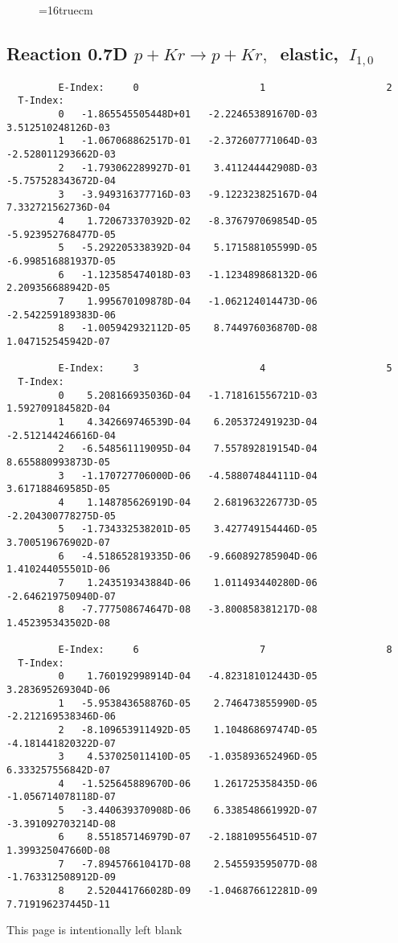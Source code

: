 \documentclass[12pt,dvipdfmx]{article}
\begin{document}
\begin{figure} \label{0.7T}
\epsfxsize=16truecm
\end{figure}
\newpage

\subsection{
Reaction 0.7D  $p + Kr \rightarrow p + Kr ,\ $
 elastic, $\  I_{1,0}$
}

\begin{small}\begin{verbatim}
         E-Index:     0                     1                     2
  T-Index:
         0   -1.865545505448D+01   -2.224653891670D-03    3.512510248126D-03
         1   -1.067068862517D-01   -2.372607771064D-03   -2.528011293662D-03
         2   -1.793062289927D-01    3.411244442908D-03   -5.757528343672D-04
         3   -3.949316377716D-03   -9.122323825167D-04    7.332721562736D-04
         4    1.720673370392D-02   -8.376797069854D-05   -5.923952768477D-05
         5   -5.292205338392D-04    5.171588105599D-05   -6.998516881937D-05
         6   -1.123585474018D-03   -1.123489868132D-06    2.209356688942D-05
         7    1.995670109878D-04   -1.062124014473D-06   -2.542259189383D-06
         8   -1.005942932112D-05    8.744976036870D-08    1.047152545942D-07

         E-Index:     3                     4                     5
  T-Index:
         0    5.208166935036D-04   -1.718161556721D-03    1.592709184582D-04
         1    4.342669746539D-04    6.205372491923D-04   -2.512144246616D-04
         2   -6.548561119095D-04    7.557892819154D-04    8.655880993873D-05
         3   -1.170727706000D-06   -4.588074844111D-04    3.617188469585D-05
         4    1.148785626919D-04    2.681963226773D-05   -2.204300778275D-05
         5   -1.734332538201D-05    3.427749154446D-05    3.700519676902D-07
         6   -4.518652819335D-06   -9.660892785904D-06    1.410244055501D-06
         7    1.243519343884D-06    1.011493440280D-06   -2.646219750940D-07
         8   -7.777508674647D-08   -3.800858381217D-08    1.452395343502D-08

         E-Index:     6                     7                     8
  T-Index:
         0    1.760192998914D-04   -4.823181012443D-05    3.283695269304D-06
         1   -5.953843658876D-05    2.746473855990D-05   -2.212169538346D-06
         2   -8.109653911492D-05    1.104868697474D-05   -4.181441820322D-07
         3    4.537025011410D-05   -1.035893652496D-05    6.333257556842D-07
         4   -1.525645889670D-06    1.261725358435D-06   -1.056714078118D-07
         5   -3.440639370908D-06    6.338548661992D-07   -3.391092703214D-08
         6    8.551857146979D-07   -2.188109556451D-07    1.399325047660D-08
         7   -7.894576610417D-08    2.545593595077D-08   -1.763312508912D-09
         8    2.520441766028D-09   -1.046876612281D-09    7.719196237445D-11

\end{verbatim}\end{small}
\newpage
This page is intentionally left blank
\newpage
\end{document}

